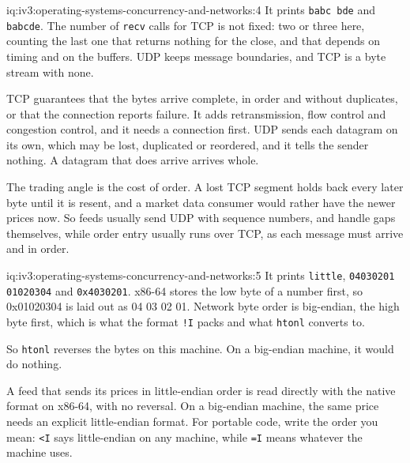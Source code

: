 \begin{solution}{iq:iv3:operating-systems-concurrency-and-networks:4}
It prints \texttt{b\textquotesingle{}abc\textquotesingle{} b\textquotesingle{}de\textquotesingle{}} and \texttt{b\textquotesingle{}abcde\textquotesingle{}}. The number of \texttt{recv} calls for TCP is not fixed: two or three here, counting the last one that returns nothing for the close, and that depends on timing and on the buffers. UDP keeps message boundaries, and TCP is a byte stream with none.

TCP guarantees that the bytes arrive complete, in order and without duplicates, or that the connection reports failure. It adds retransmission, flow control and congestion control, and it needs a connection first. UDP sends each datagram on its own, which may be lost, duplicated or reordered, and it tells the sender nothing. A datagram that does arrive arrives whole.

The trading angle is the cost of order. A lost TCP segment holds back every later byte until it is resent, and a market data consumer would rather have the newer prices now. So feeds usually send UDP with sequence numbers, and handle gaps themselves, while order entry usually runs over TCP, as each message must arrive and in order.

\end{solution}

\begin{solution}{iq:iv3:operating-systems-concurrency-and-networks:5}
It prints \texttt{little}, \texttt{04030201 01020304} and \texttt{0x4030201}. x86-64 stores the low byte of a number first, so 0x01020304 is laid out as 04 03 02 01. Network byte order is big-endian, the high byte first, which is what the format \texttt{!I} packs and what \texttt{htonl} converts to.

So \texttt{htonl} reverses the bytes on this machine. On a big-endian machine, it would do nothing.

A feed that sends its prices in little-endian order is read directly with the native format on x86-64, with no reversal. On a big-endian machine, the same price needs an explicit little-endian format. For portable code, write the order you mean: \texttt{<I} says little-endian on any machine, while \texttt{=I} means whatever the machine uses.

\end{solution}

